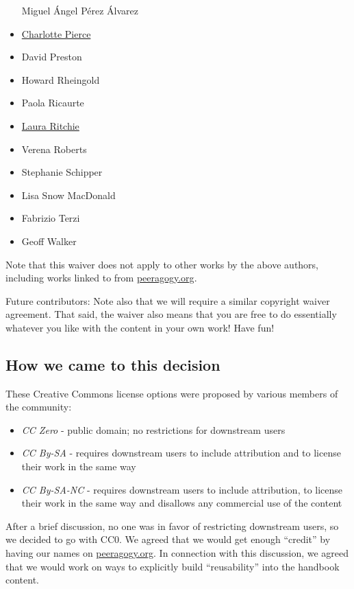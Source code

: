 \begin{itemize}
  Miguel Ángel Pérez Álvarez
\item
  \href{http://piercepress.com}{Charlotte Pierce}
\item
  David Preston
\item
  Howard Rheingold
\item
  Paola Ricaurte
\item
  \href{http://www.lauraritchie.com/}{Laura Ritchie}
\item
  Verena Roberts
\item
  Stephanie Schipper
\item
  Lisa Snow MacDonald
\item
  Fabrizio Terzi
\item
  Geoff Walker
\end{itemize}

Note that this waiver does not apply to other works by the above
authors, including works linked to from
\href{http://peeragogy.org}{peeragogy.org}.

Future contributors: Note also that we will require a similar copyright
waiver agreement. That said, the waiver also means that you are free to
do essentially whatever you like with the content in your own work! Have
fun!

\hypertarget{how-we-came-to-this-decision}{%
\subsection{How we came to this
decision}\label{how-we-came-to-this-decision}}

These Creative Commons license options were proposed by various members
of the community:

\begin{itemize}
\tightlist
\item
  \emph{CC Zero} - public domain; no restrictions for downstream users
\item
  \emph{CC By-SA} - requires downstream users to include attribution and
  to license their work in the same way
\item
  \emph{CC By-SA-NC} - requires downstream users to include attribution,
  to license their work in the same way and disallows any commercial use
  of the content
\end{itemize}

After a brief discussion, no one was in favor of restricting downstream
users, so we decided to go with CC0. We agreed that we would get enough
``credit'' by having our names on
\href{http://peeragogy.org/}{peeragogy.org}. In connection with this
discussion, we agreed that we would work on ways to explicitly build
``reusability'' into the handbook content.
